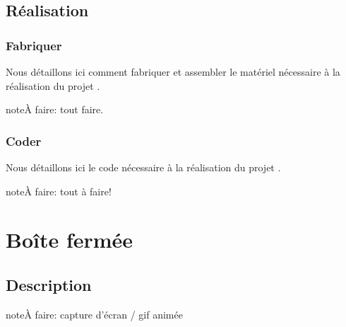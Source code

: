 \documentclass[letterpaper,10pt,french]{sphinxmanual}
\begin{document}
\subsection{Réalisation}
\label{\detokenize{projets/coffre:realisation}}

\subsubsection{Fabriquer}
\label{\detokenize{projets/coffre-fabriquer::doc}}\label{\detokenize{projets/coffre-fabriquer:fabriquer}}
Nous détaillons ici comment fabriquer et assembler
le matériel nécessaire à la réalisation du projet
{\hyperref[\detokenize{projets/coffre:projetcoffre}]{}}.

\begin{sphinxadmonition}{note}{\label{projets/coffre-fabriquer:index-0}À faire:}
tout faire.
\end{sphinxadmonition}

\ignorespaces 

\subsubsection{Coder}
\label{\detokenize{projets/coffre-coder:index-0}}\label{\detokenize{projets/coffre-coder:coder}}\label{\detokenize{projets/coffre-coder::doc}}
Nous détaillons ici le code nécessaire à la réalisation
du projet {\hyperref[\detokenize{projets/coffre:projetcoffre}]{}}.

\begin{sphinxadmonition}{note}{\label{projets/coffre-coder:index-1}À faire:}
tout à faire!
\end{sphinxadmonition}


\section{Boîte fermée}
\label{\detokenize{projets/boite-fermee:boite-fermee}}\label{\detokenize{projets/boite-fermee::doc}}\label{\detokenize{projets/boite-fermee:projetboite}}

\subsection{Description}
\label{\detokenize{projets/boite-fermee:description}}
\begin{sphinxadmonition}{note}{\label{projets/boite-fermee:index-0}À faire:}
capture d’écran / gif animée
\end{sphinxadmonition}
\end{document}
